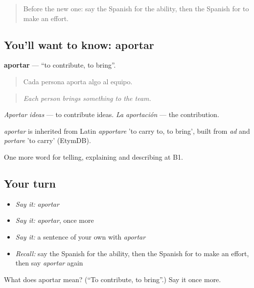 \label{lesson:ES-C598-aportar}



\begin{quote}
Before the new one: say the Spanish for the ability, then the Spanish for to make an effort.
\end{quote}

\subsection*{You'll want to know: aportar}
\textbf{aportar} — \textquotedblleft{}to contribute, to bring\textquotedblright{}.

\begin{quote}
Cada persona aporta algo al equipo.
\end{quote}

\begin{quote}
\emph{Each person brings something to the team.}
\end{quote}

\emph{Aportar ideas} — to contribute ideas. \emph{La aportación} — the contribution.

\begin{cousinweb}
\emph{aportar} is inherited from Latin \emph{apportare} 'to carry to, to bring', built from \emph{ad} and \emph{portare} 'to carry' (EtymDB).
\end{cousinweb}

\begin{grammarlens}[title={What you've built}]
One more word for telling, explaining and describing at B1.
\end{grammarlens}

\subsection*{Your turn}
\begin{itemize}
\raggedright
  \item \emph{Say it:} \emph{aportar}
  \item \emph{Say it:} \emph{aportar}, once more
  \item \emph{Say it:} a sentence of your own with \emph{aportar}
  \item \emph{Recall:} say the Spanish for the ability, then the Spanish for to make an effort, then say \emph{aportar} again
\end{itemize}

\begin{tcolorbox}[breakable,colback=teal!4,colframe=teal!35!black,title={Before you move on}]
What does aportar mean? (\textquotedblleft{}To contribute, to bring\textquotedblright{}.) Say it once more.
\end{tcolorbox}
